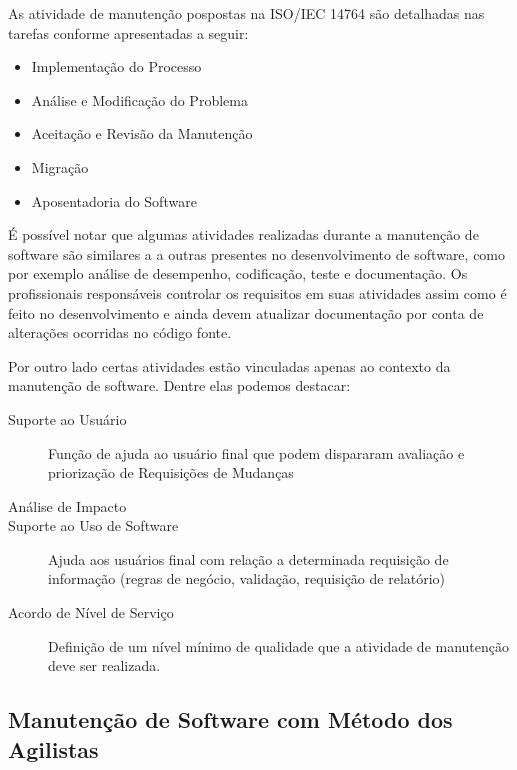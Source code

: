 As atividade de manutenção pospostas na ISO/IEC 14764 são detalhadas nas tarefas conforme apresentadas
a seguir:

\begin{itemize}
	\item Implementação do Processo
	\item Análise e Modificação do Problema
	\item Aceitação e Revisão da Manutenção
	\item Migração
	\item Aposentadoria do Software	
\end{itemize}

É possível notar que algumas atividades realizadas durante a manutenção de software são similares a
a outras presentes no desenvolvimento de software, como por exemplo análise de desempenho,
codificação, teste e documentação. Os profissionais responsáveis controlar os requisitos em suas
atividades assim como é feito no desenvolvimento e ainda devem atualizar documentação  por conta de
alterações ocorridas no código fonte. 

Por outro lado certas atividades estão vinculadas apenas ao contexto da manutenção de software. Dentre elas podemos destacar:

\begin{description}
	\item[Suporte ao Usuário] Função de ajuda ao usuário final que podem dispararam avaliação e
		priorização de Requisições de Mudanças
	\item [Análise de Impacto]
	\item [Suporte ao Uso de Software] Ajuda aos usuários final com relação a determinada requisição
		de informação (regras de negócio, validação, requisição de relatório)
	\item [Acordo de Nível de Serviço] Definição de um nível mínimo de qualidade que a atividade de
		manutenção deve ser realizada.	
\end{description}

\subsection{Manutenção de Software com Método dos Agilistas}
\label{sub:manutenção_de_software_com_método_dos_agilistas}

